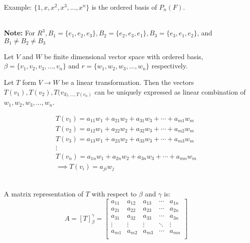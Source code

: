 \documentclass[english,course,fleqn]{lecture}
\begin{document}
Example: $\{1,x,x^{2}, x^{3}, \ldots, x^{n}\}$ is the ordered basis of $P_{n}(F)$.

\\

\textbf{Note:} For $R^{3}, B_{1} = \{e_{1},e_{2}, e_{3}\}, B_{2} = \{e_{2},e_{3}, e_{1}\}, B_{3} = \{e_{3},e_{1}, e_{2}\}$, and $B_{1} \ne B_{2} \ne B_{3}$

Let $V$ and $W$ be finite dimensional vector space with ordered basis, $\beta = \{v_{1}, v_{2}, v_{3}, \ldots, v_{n}\}$
and $r = \{w_{1}, w_{2}, w_{3}, \ldots, w_{n}\}$ respectively.

Let $T$ form $V \rightarrow W$ be a linear transformation. Then the vectors $T(v_{1}), T(v_{2}), T(v_{3), \ldots, T(v_{n})}$ can be uniquely expressed as linear combination of
$w_{1}, w_{2}, w_{3}, \ldots, w_{n}$.

\begin{gather*}
  T(v_{1}) = a_{11}w_{1} + a_{21}w_{2} + a_{31}w_{3} + \cdots + a_{m1}w_{m}\\
  T(v_{2}) = a_{12}w_{1} + a_{22}w_{2} + a_{32}w_{3} + \cdots + a_{m2}w_{m}\\
  T(v_{3}) = a_{13}w_{1} + a_{23}w_{2} + a_{33}w_{3} + \cdots + a_{m3}w_{m}\\
  \vdots\\
  T(v_{n}) = a_{1n}w_{1} + a_{2n}w_{2} + a_{3n}w_{3} + \cdots + a_{mn}w_{m}\\
  \implies T(v_{i}) = a_{ji}w_{j}
\end{gather*}

\\

A matrix representation of $T$ with respect to $\beta$ and $\gamma$ is:
\[
  A = {[T]}_{\beta}^{\gamma} = \begin{bmatrix}
    a_{11} & a_{12} & a_{13} & \cdots & a_{1n} \\
    a_{21} & a_{22} & a_{23} & \cdots & a_{2n} \\
    a_{31} & a_{32} & a_{33} & \cdots & a_{3n} \\
    \vdots & \vdots & \vdots & \ddots & \vdots \\
    a_{m1} & a_{m2} & a_{m3} & \cdots & a_{mn} \\
  \end{bmatrix}
\]
\end{document}
